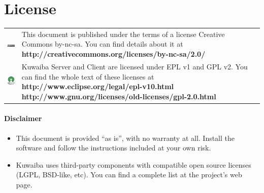 \documentclass[a4paper]{article}
\begin{document}
	\section{License}
		\begin{table}[ht]
			\centering
			\begin{tabular}{cp{10cm}}
				
				\includegraphics[]{img/cc_license_logo.jpg} & This document is published under the terms of a license Creative Commons by-nc-sa. You can find details about it at\linebreak
				\textbf{http://creativecommons.org/licenses/by-nc-sa/2.0/ } \\

				\includegraphics[width=2cm]{img/osi_logo.jpg} & Kuwaiba Server and Client are licensed under EPL v1 and GPL v2. You can find the whole text of these licenses at \linebreak
				\textbf{http://www.eclipse.org/legal/epl-v10.html} \linebreak
				\textbf{http://www.gnu.org/licenses/old-licenses/gpl-2.0.html} \\
			\end{tabular}
		\end{table}
		\paragraph{Disclaimer} \hspace{0pt}
		\begin{itemize}
			
			
			\item This document is provided “as is”, with no warranty at all. Install the software and follow the instructions included at your own risk.
			
			\item Kuwaiba uses third-party components with compatible open source licenses (LGPL, BSD-like, etc). You can find a complete list at the project's web page.
		\end{itemize}
	
	\newpage
\end{document}
